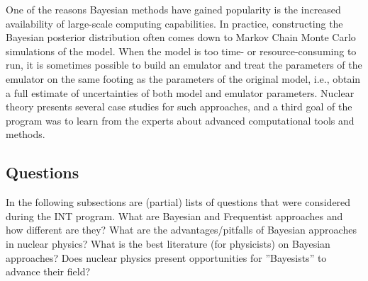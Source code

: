 One of the reasons Bayesian methods have gained popularity is the increased
availability of large-scale computing capabilities. In practice, constructing
the Bayesian posterior distribution often comes down to Markov Chain Monte
Carlo simulations of the model. When the model is too time- or resource-consuming
to run, it is sometimes possible to build an emulator and treat the parameters
of the emulator on the same footing as the parameters of the original model,
i.e., obtain a full estimate of uncertainties of both model and emulator
parameters. Nuclear theory presents several case studies for such approaches,
and a third goal of the program was to learn from the experts about advanced
computational tools and methods.

\subsection{Questions} \label{subsec:questions}

In the following subsections are (partial) lists of questions that were considered
during the INT program.
\bi
  \I What are Bayesian and Frequentist approaches and how different are they?
  \I What are the advantages/pitfalls of Bayesian approaches in nuclear physics?
  \I What is the best literature (for physicists) on Bayesian approaches?
  \I Does nuclear physics present opportunities for ''Bayesists'' to advance their
     field?
\ei


